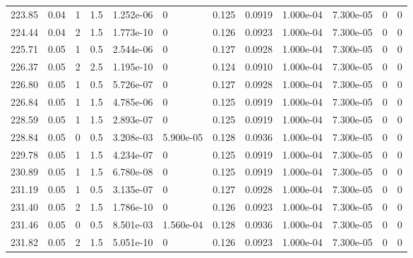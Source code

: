 \documentclass[preview]{standalone}
\begin{document}
{{{{{{{\begin{tabular}{L{1.2cm}C{1.2cm} C{0.3cm}C{0.5cm} C{1.4cm}C{1.4cm} C{1.4cm}C{1.4cm} C{1.6cm}C{1.6cm} C{1.6cm}C{1.6cm}}
  223.85  &  0.04  & 1     & 1.5 &  1.252e-06  & 0  &  0.125&   0.0919& 1.000e-04 & 7.300e-05   &  0 & 0  \\ 
  224.44  &  0.04  & 2     & 1.5 &  1.773e-10  & 0  &  0.126&   0.0923& 1.000e-04 & 7.300e-05   &  0 & 0  \\ 
  225.71  &  0.05  & 1     & 0.5 &  2.544e-06  & 0  &  0.127&   0.0928& 1.000e-04 & 7.300e-05   &  0 & 0  \\ 
  226.37  &  0.05  & 2     & 2.5 &  1.195e-10  & 0  &  0.124&   0.0910& 1.000e-04 & 7.300e-05   &  0 & 0  \\ 
  226.80  &  0.05  & 1     & 0.5 &  5.726e-07  & 0  &  0.127&   0.0928& 1.000e-04 & 7.300e-05   &  0 & 0  \\ 
  226.84  &  0.05  & 1     & 1.5 &  4.785e-06  & 0  &  0.125&   0.0919& 1.000e-04 & 7.300e-05   &  0 & 0  \\ 
  228.59  &  0.05  & 1     & 1.5 &  2.893e-07  & 0  &  0.125&   0.0919& 1.000e-04 & 7.300e-05   &  0 & 0  \\ 
  228.84  &  0.05  & 0     & 0.5 &  3.208e-03  & 5.900e-05  &  0.128&   0.0936& 1.000e-04 & 7.300e-05   &  0 & 0  \\ 
  229.78  &  0.05  & 1     & 1.5 &  4.234e-07  & 0  &  0.125&   0.0919& 1.000e-04 & 7.300e-05   &  0 & 0  \\ 
  230.89  &  0.05  & 1     & 1.5 &  6.780e-08  & 0  &  0.125&   0.0919& 1.000e-04 & 7.300e-05   &  0 & 0  \\ 
  231.19  &  0.05  & 1     & 0.5 &  3.135e-07  & 0  &  0.127&   0.0928& 1.000e-04 & 7.300e-05   &  0 & 0  \\ 
  231.40  &  0.05  & 2     & 1.5 &  1.786e-10  & 0  &  0.126&   0.0923& 1.000e-04 & 7.300e-05   &  0 & 0  \\ 
  231.46  &  0.05  & 0     & 0.5 &  8.501e-03  & 1.560e-04  &  0.128&   0.0936& 1.000e-04 & 7.300e-05   &  0 & 0  \\ 
  231.82  &  0.05  & 2     & 1.5 &  5.051e-10  & 0  &  0.126&   0.0923& 1.000e-04 & 7.300e-05   &  0 & 0  \\ 
\hline 
\end{tabular} 

}}}}}}}
\end{document}

